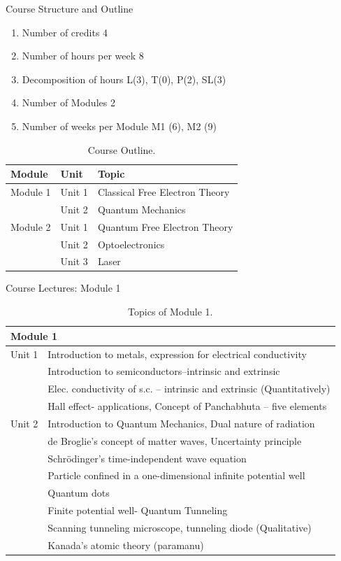 \begin{frame}[label=syllabus]{Course Structure and Outline}
%
	\begin{enumerate}
		\item Number of credits	\hfill 4
		\item Number of hours per week \hfill 8
		\item Decomposition of hours \hfill L(3), T(0), P(2), SL(3) 
		\item Number of Modules	\hfill 2
		\item Number of weeks per Module \hfill M1 (6), M2 (9)
	\end{enumerate}
	\begin{table}
		\begin{tabular}{l l l}
			\toprule
			Module	&	Unit	&	Topic	\\
			\midrule
			Module 1	&	Unit 1	&	Classical Free Electron Theory \\
			&	Unit 2 	&	Quantum Mechanics	\\
			Module 2	&	Unit 1	&	Quantum Free Electron Theory	\\
			&	Unit 2	& 	Optoelectronics	\\
			&	Unit 3	&	Laser	\\
			\bottomrule
		\end{tabular}
		\caption{Course Outline.}
	\end{table}
\end{frame}	
%
\begin{frame}{Course Lectures: Module 1}
	
	{
		\small	
		\begin{table}
			\begin{tabular}{ll}
				\toprule
				\multicolumn{2}{l}{Module 1}	\\
				\midrule
				Unit 1 	& Introduction to metals, expression for electrical conductivity \\
				& Introduction to semiconductors--intrinsic and extrinsic \\
				& Elec. conductivity of s.c. -- intrinsic and extrinsic (Quantitatively) \\
				& Hall effect- applications, Concept of Panchabhuta -- five elements	\\
				Unit 2 & Introduction to Quantum Mechanics, Dual nature of radiation \\
				& de Broglie’s concept of matter waves, Uncertainty principle \\
				& Schrödinger’s time-independent wave equation\\ & Particle confined in a one-dimensional infinite potential well\\
				& Quantum dots \\ 
				& Finite potential well- Quantum Tunneling \\
				& Scanning tunneling microscope, tunneling diode (Qualitative)	\\
				&	Kanada's atomic theory (paramanu)	\\
				\bottomrule
			\end{tabular}
			\caption{Topics of Module 1.}
		\end{table}
	}
\end{frame}
